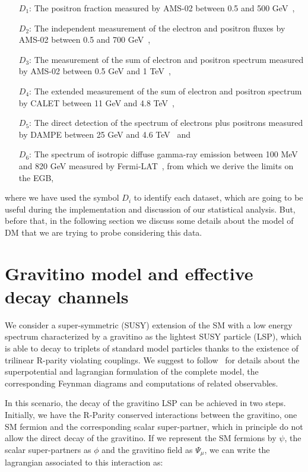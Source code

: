 \documentclass[a4paper,11pt]{article}
\begin{document}
\begin{itemize}
\item[$D_1$:] The positron fraction measured by AMS-02 between 0.5 and 500 GeV~\cite{Accardo:2014lma},
\item[$D_2$:] The independent measurement of the electron and positron fluxes by AMS-02 between 0.5 and 700 GeV~\cite{Aguilar:2014mma},
\item[$D_3$:] The measurement of the sum of electron and positron spectrum measured by AMS-02 between 0.5 GeV and 1 TeV~\cite{Aguilar:2014fea},
\item[$D_4$:] The extended measurement of the sum of electron and positron spectrum by CALET between 11 GeV and 4.8 TeV~\cite{Adriani:2018ktz},
\item[$D_5$:] The direct detection of the spectrum of electrons plus positrons measured by DAMPE between 25 GeV and 4.6 TeV~\cite{Ambrosi:2017wek} and
\item[$D_6$:] The spectrum of isotropic diffuse gamma-ray emission between 100 MeV and 820 GeV measured by Fermi-LAT~\cite{Ackermann:2014usa}, from which we derive the limits on the EGB,
\end{itemize}
 
\noindent where we have used the symbol $D_i$ to identify each dataset, which are going to be useful during the implementation and discussion of our statistical analysis. But, before that, in the following section we discuss some details about the model of DM that we are trying to probe considering this data.

 
\section{Gravitino model and effective decay channels}
\label{gdecay}

We consider a super-symmetric (SUSY) extension of the SM with a low energy spectrum characterized by a gravitino as the lightest SUSY particle (LSP), which is able to decay to triplets of standard model particles thanks to the existence of trilinear R-parity violating couplings. We suggest to follow~\cite{Grefe:2011dp, Moreau:2001sr} for details about the superpotential and lagrangian formulation of the complete model, the corresponding Feynman diagrams and computations of related observables. 

In this scenario, the decay of the gravitino LSP can be achieved in two steps. Initially, we have the R-Parity conserved interactions between the gravitino, one SM fermion and the corresponding scalar super-partner, which in principle do not allow the direct decay of the gravitino. If we represent the SM fermions by $\psi$, the scalar super-partners as $\phi$ and the gravitino field as $\Psi_\mu$, we can write the lagrangian associated to this interaction as:
\end{document}
